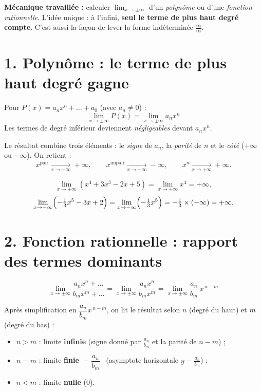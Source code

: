 \documentclass[11pt,a4paper]{article}
\begin{document}
\begin{tcolorbox}[boxbase,colback=primary!12,colframe=primary,
   title={\Large Thème 3 — Limites à l'infini : le terme dominant}]
\textbf{Mécanique travaillée :} calculer $\displaystyle\lim_{x\to\pm\infty}$ d'un \emph{polynôme} ou
d'une \emph{fonction rationnelle}. L'idée unique : à l'infini, \textbf{seul le terme de plus haut
degré compte}. C'est aussi la façon de lever la forme indéterminée $\frac{\infty}{\infty}$.
\end{tcolorbox}

\section{1. Polynôme : le terme de plus haut degré gagne}

\begin{idee}
Pour $P(x)=a_n x^n+\dots+a_0$ (avec $a_n\neq 0$) :
\[ \boxed{\ \lim_{x\to\pm\infty} P(x)=\lim_{x\to\pm\infty} a_n x^n\ } \]
Les termes de degré inférieur deviennent \emph{négligeables} devant $a_n x^n$.
\end{idee}

Le résultat combine trois éléments : le \emph{signe} de $a_n$, la \emph{parité} de $n$ et le
\emph{côté} ($+\infty$ ou $-\infty$). On retient :
\[ x^{\text{pair}}\xrightarrow[x\to-\infty]{}+\infty,\qquad x^{\text{impair}}\xrightarrow[x\to-\infty]{}-\infty,\qquad x^{n}\xrightarrow[x\to+\infty]{}+\infty. \]

\begin{exemple}[polynômes]
\[ \lim_{x\to+\infty}(x^4+3x^3-2x+5)=\lim_{x\to+\infty}x^4=+\infty, \]
\[ \lim_{x\to-\infty}\Bigl(-\tfrac13 x^5-3x+2\Bigr)=\lim_{x\to-\infty}\Bigl(-\tfrac13 x^5\Bigr)
   =-\tfrac13\times(-\infty)=+\infty. \]
\end{exemple}

\section{2. Fonction rationnelle : rapport des termes dominants}

\begin{idee}
\[ \boxed{\ \lim_{x\to\pm\infty}\frac{a_n x^n+\dots}{b_m x^m+\dots}=\lim_{x\to\pm\infty}\frac{a_n x^n}{b_m x^m}=\lim_{x\to\pm\infty}\frac{a_n}{b_m}\,x^{\,n-m}\ } \]
\end{idee}

\begin{methode}
Après simplification en $\dfrac{a_n}{b_m}x^{\,n-m}$, on lit le résultat selon $n$ (degré du haut) et
$m$ (degré du bas) :
\begin{itemize}[leftmargin=1.5em,topsep=2pt,itemsep=1pt]
  \item $n>m$ : limite \textbf{infinie} (signe donné par $\frac{a_n}{b_m}$ et la parité de $n-m$) ;
  \item $n=m$ : limite \textbf{finie} $=\dfrac{a_n}{b_m}$ \ (asymptote horizontale $y=\frac{a_n}{b_m}$) ;
  \item $n<m$ : limite \textbf{nulle} ($0$).
\end{itemize}
\end{methode}
\end{document}
